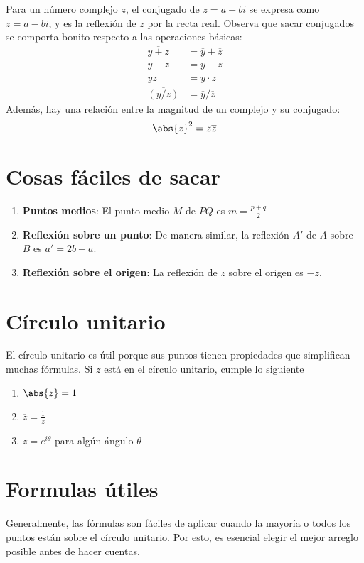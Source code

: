 \documentclass[11pt]{scrartcl}
\begin{document}
Para un número complejo $z$, el conjugado de $z=a+bi$ se expresa como $\overline z = a-bi$, y es la reflexión de $z$ por la recta real. Observa que sacar conjugados se comporta bonito respecto a las operaciones básicas: 
\begin{align*}
    \overline{y+z} &=\overline{y}+\overline{z} \\
    \overline{y-z} &=\overline{y}-\overline{z} \\
    \overline{yz} &= \overline{y}\cdot \overline{z} \\
    \overline{(y/z)} &=\overline y / \overline z
\end{align*}
Además, hay una relación entre la magnitud de un complejo y su conjugado: $$\abs{z}^2=z\overline z$$

\section{Cosas fáciles de sacar}
\begin{enumerate}
    \item \textbf{Puntos medios}: El punto medio $M$ de $PQ$ es $m=\frac{p+q}{2}$
    \item \textbf{Reflexión sobre un punto}: De manera similar, la reflexión $A'$ de $A$ sobre $B$ es $a' = 2b-a$.
    \item \textbf{Reflexión sobre el origen}: La reflexión de $z$ sobre el origen es $-z$.
\end{enumerate}

\section{Círculo unitario}
    El círculo unitario es útil porque sus puntos tienen propiedades que simplifican muchas fórmulas. Si $z$ está en el círculo unitario, cumple lo siguiente
    \begin{enumerate}
        \item $\abs{z}=1$
        \item $\overline z =\frac{1}{z}$
        \item $z=e^{i\theta}$ para algún ángulo $\theta$
    \end{enumerate}

\section{Formulas útiles}

Generalmente, las fórmulas son fáciles de aplicar cuando la mayoría o todos los puntos están sobre el círculo unitario. Por esto, es esencial elegir el mejor arreglo posible antes de hacer cuentas.
\end{document}
